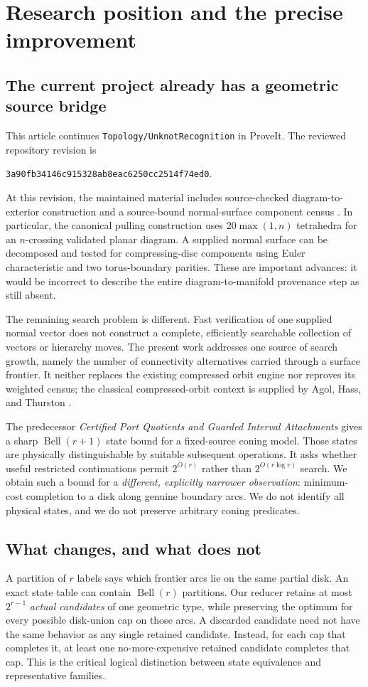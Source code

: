 \documentclass[11pt,a4paper]{article}
\theoremstyle{definition}
\theoremstyle{remark}
\newcommand{\Bell}{\operatorname{Bell}}
\begin{document}
\section{Research position and the precise improvement}\label{sec:position}
\subsection{The current project already has a geometric source bridge}
This article continues \texttt{Topology/UnknotRecognition} in ProveIt. The reviewed
repository revision is
\begin{center}\small\texttt{3a90fb34146c915328ab8eac6250cc2514f74ed0}.\end{center}
At this revision, the maintained material includes source-checked diagram-to-exterior
construction and a source-bound normal-surface component census
\cite{proveit-exterior,proveit-weighted}. In particular, the canonical pulling construction
uses $20\max(1,n)$ tetrahedra for an $n$-crossing validated planar diagram. A supplied
normal surface can be decomposed and tested for compressing-disc components using Euler
characteristic and two torus-boundary parities. These are important advances: it would be
incorrect to describe the entire diagram-to-manifold provenance step as still absent.

The remaining search problem is different. Fast verification of one supplied normal vector
does not construct a complete, efficiently searchable collection of vectors or hierarchy
moves. The present work addresses one source of search growth, namely the number of
connectivity alternatives carried through a surface frontier. It neither replaces the
existing compressed orbit engine nor reproves its weighted census; the classical
compressed-orbit context is supplied by Agol, Hass, and Thurston \cite{aht}.

The predecessor \emph{Certified Port Quotients and Guarded Interval Attachments}
\cite{port-report} gives a sharp $\Bell(r+1)$ state bound for a fixed-source coning model.
Those states are physically distinguishable by suitable subsequent operations. It asks
whether useful restricted continuations permit $2^{O(r)}$ rather than
$2^{O(r\log r)}$ search. We obtain such a bound for a \emph{different, explicitly narrower
observation}: minimum-cost completion to a disk along genuine boundary arcs. We do not
identify all physical states, and we do not preserve arbitrary coning predicates.

\subsection{What changes, and what does not}
A partition of $r$ labels says which frontier arcs lie on the same partial disk. An exact
state table can contain $\Bell(r)$ partitions. Our reducer retains at most $2^{r-1}$
\emph{actual candidates} of one geometric type, while preserving the optimum for every
possible disk-union cap on those arcs. A discarded candidate need not have the same
behavior as any single retained candidate. Instead, for each cap that completes it, at
least one no-more-expensive retained candidate completes that cap. This is the critical
logical distinction between state equivalence and representative families.
\end{document}
